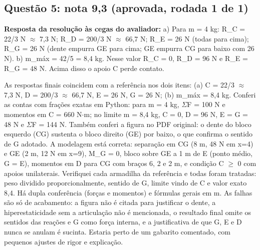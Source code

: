 \documentclass{article}%
\begin{document}
\subsection*{Questão 5: nota 9,3 (aprovada, rodada 1 de 1)}%
\textbf{Resposta da resolução às cegas do avaliador:} a) Para m = 4 kg: R\_C = 22/3 N $\approx$ 7,3 N; R\_D = 200/3 N $\approx$ 66,7 N; R\_E = 26 N (todas para cima); R\_G = 26 N (dente empurra GE para cima; GE empurra CG para baixo com 26 N).\newline%
b) m\_máx = 42/5 = 8,4 kg. Nesse valor R\_C = 0, R\_D = 96 N e R\_E = R\_G = 48 N. Acima disso o apoio C perde contato.\par %
As respostas finais coincidem com a referência nos dois itens: (a) C = 22/3 $\approx$ 7,3 N, D = 200/3 $\approx$ 66,7 N, E = 26 N, G = 26 N; (b) m\_máx = 8,4 kg. Conferi as contas com frações exatas em Python: para m = 4 kg, $\Sigma$F = 100 N e momentos em C = 660 N$\cdot$m; no limite m = 8,4 kg, C = 0, D = 96 N, E = G = 48 N e $\Sigma$F = 144 N. Também conferi a figura no PDF original: o dente do bloco esquerdo (CG) sustenta o bloco direito (GE) por baixo, o que confirma o sentido de G adotado. A modelagem está correta: separação em CG (8 m, 48 N em x=4) e GE (2 m, 12 N em x=9), M\_G = 0, bloco sobre GE a 1 m de E (ponto médio, G = E), momentos em D para CG com braços 6, 2 e 2 m, e condição C $\geq$ 0 com apoios unilaterais. Verifiquei cada armadilha da referência e todas foram tratadas: peso dividido proporcionalmente, sentido de G, limite vindo de C e valor exato 8,4. Há dupla conferência (forças e momentos) e fórmulas gerais em m. As falhas são só de acabamento: a figura não é citada para justificar o dente, a hiperestaticidade sem a articulação não é mencionada, o resultado final omite os sentidos das reações e G como força interna, e a justificativa de que G, E e D nunca se anulam é sucinta. Estaria perto de um gabarito comentado, com pequenos ajustes de rigor e explicação.%
\end{document}
